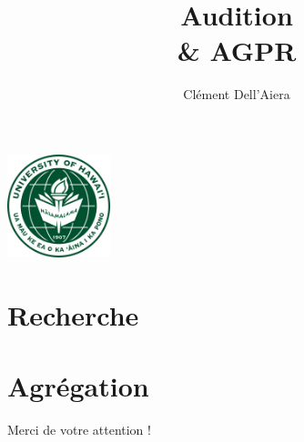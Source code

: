 \documentclass{beamer}
\title[First Steps with SCRATCH]{Audition\\ \& AGPR}
\author{Clément Dell'Aiera}
\institute{University of Hawai'i at Manoa}
\date{}
\begin{document}
\begin{frame}
\titlepage
\begin{center} \includegraphics[width=3cm]{UH_logo.png}\end{center}
\end{frame}

\begin{frame}
  \tableofcontents\end{frame}

\section{Recherche}


\section{Agr\'egation}
\begin{frame}
  \tableofcontents[currentsection]
\end{frame}


\footnotesize

%
%

\Large
\begin{frame}{}
Merci de votre attention !
\end{frame}
\end{document}

